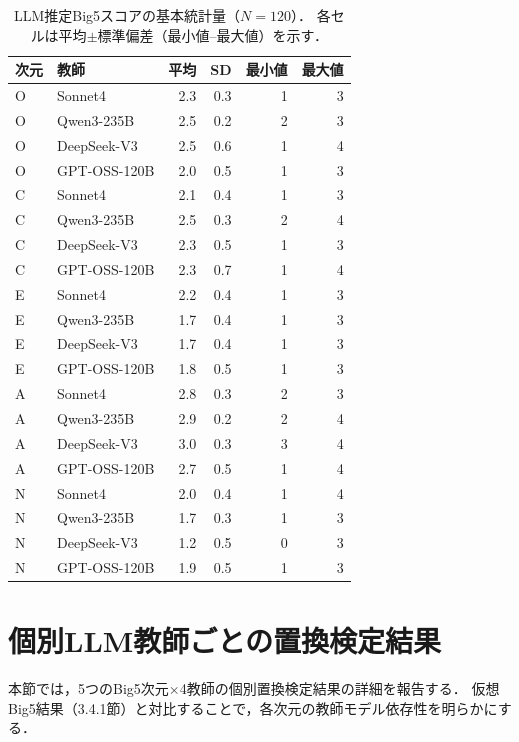 \documentclass[dvipdfmx,11pt,a4paper]{bxjsarticle}
\renewcommand{\_}{\paperorigunderscore\allowbreak}%
\begin{document}
\begin{table}[htbp]
\centering
\caption{LLM推定Big5スコアの基本統計量（$N = 120$）．
各セルは平均$\pm$標準偏差（最小値--最大値）を示す．}
\label{tab:score_stats}
\begin{tabular}{llrrrr}
\toprule
次元 & 教師 & 平均 & SD & 最小値 & 最大値 \\
\midrule
O & Sonnet4       & 2.3 & 0.3 & 1 & 3 \\
O & Qwen3-235B    & 2.5 & 0.2 & 2 & 3 \\
O & DeepSeek-V3   & 2.5 & 0.6 & 1 & 4 \\
O & GPT-OSS-120B  & 2.0 & 0.5 & 1 & 3 \\
\midrule
C & Sonnet4       & 2.1 & 0.4 & 1 & 3 \\
C & Qwen3-235B    & 2.5 & 0.3 & 2 & 4 \\
C & DeepSeek-V3   & 2.3 & 0.5 & 1 & 3 \\
C & GPT-OSS-120B  & 2.3 & 0.7 & 1 & 4 \\
\midrule
E & Sonnet4       & 2.2 & 0.4 & 1 & 3 \\
E & Qwen3-235B    & 1.7 & 0.4 & 1 & 3 \\
E & DeepSeek-V3   & 1.7 & 0.4 & 1 & 3 \\
E & GPT-OSS-120B  & 1.8 & 0.5 & 1 & 3 \\
\midrule
A & Sonnet4       & 2.8 & 0.3 & 2 & 3 \\
A & Qwen3-235B    & 2.9 & 0.2 & 2 & 4 \\
A & DeepSeek-V3   & 3.0 & 0.3 & 3 & 4 \\
A & GPT-OSS-120B  & 2.7 & 0.5 & 1 & 4 \\
\midrule
N & Sonnet4       & 2.0 & 0.4 & 1 & 4 \\
N & Qwen3-235B    & 1.7 & 0.3 & 1 & 3 \\
N & DeepSeek-V3   & 1.2 & 0.5 & 0 & 3 \\
N & GPT-OSS-120B  & 1.9 & 0.5 & 1 & 3 \\
\bottomrule
\end{tabular}
\end{table}



\section{個別LLM教師ごとの置換検定結果}
\label{sec:appendix_individual_teacher}

本節では，5つのBig5次元$\times$4教師の個別置換検定結果の詳細を報告する．
仮想Big5結果（3.4.1節）と対比することで，各次元の教師モデル依存性を明らかにする．
\end{document}
